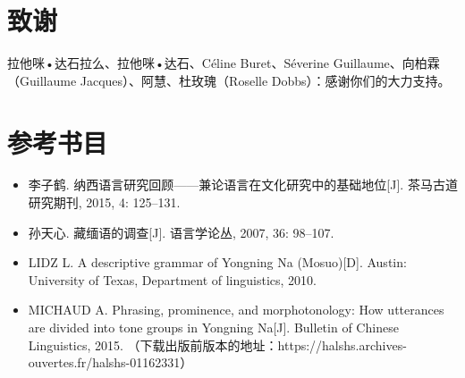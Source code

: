 	\section{致谢} \label{sec:thks}
	
拉他咪•达石拉么、拉他咪•达石、Céline Buret、Séverine Guillaume、向柏霖（Guillaume Jacques）、阿慧、杜玫瑰（Roselle Dobbs）：感谢你们的大力支持。
	

	\section{参考书目} \label{sec:refs}
	\begin{itemize}
		\item 李子鹤. 纳西语言研究回顾——兼论语言在文化研究中的基础地位[J]. 茶马古道研究期刊, 2015, 4: 125–131.
		\item 孙天心. 藏缅语的调查[J]. 语言学论丛, 2007, 36: 98–107.
		\item LIDZ L. A descriptive grammar of Yongning Na (Mosuo)[D]. Austin: University of Texas, Department of linguistics, 2010.
		\item MICHAUD A. Phrasing, prominence, and morphotonology: How utterances are divided into tone groups in Yongning Na[J]. Bulletin of Chinese Linguistics, 2015. （下载出版前版本的地址：https://halshs.archives-ouvertes.fr/halshs-01162331）
	\end{itemize}


 

	

